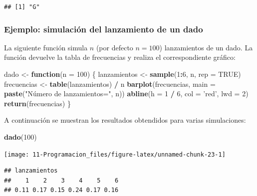 \documentclass[]{book}
\newenvironment{Shaded}{\begin{snugshade}}{\end{snugshade}}
\newcommand{\KeywordTok}[1]{\textcolor[rgb]{0.13,0.29,0.53}{\textbf{#1}}}
\newcommand{\DataTypeTok}[1]{\textcolor[rgb]{0.13,0.29,0.53}{#1}}
\newcommand{\DecValTok}[1]{\textcolor[rgb]{0.00,0.00,0.81}{#1}}
\newcommand{\StringTok}[1]{\textcolor[rgb]{0.31,0.60,0.02}{#1}}
\newcommand{\OtherTok}[1]{\textcolor[rgb]{0.56,0.35,0.01}{#1}}
\newcommand{\ControlFlowTok}[1]{\textcolor[rgb]{0.13,0.29,0.53}{\textbf{#1}}}
\newcommand{\OperatorTok}[1]{\textcolor[rgb]{0.81,0.36,0.00}{\textbf{#1}}}
\newcommand{\NormalTok}[1]{#1}
\begin{document}
\begin{verbatim}
## [1] "G"
\end{verbatim}

\subsubsection{Ejemplo: simulación del lanzamiento de un
dado}\label{ejemplo-simulacion-del-lanzamiento-de-un-dado}

La siguiente función simula \(n\) (por defecto \(n=100\)) lanzamientos
de un dado. La función devuelve la tabla de frecuencias y realiza el
correspondiente gráfico:

\begin{Shaded}
\begin{Highlighting}[]
\NormalTok{dado <-}\StringTok{ }\ControlFlowTok{function}\NormalTok{(}\DataTypeTok{n =} \DecValTok{100}\NormalTok{) \{}
\NormalTok{  lanzamientos <-}\StringTok{ }\KeywordTok{sample}\NormalTok{(}\DecValTok{1}\OperatorTok{:}\DecValTok{6}\NormalTok{, n, }\DataTypeTok{rep =} \OtherTok{TRUE}\NormalTok{)}
\NormalTok{  frecuencias <-}\StringTok{ }\KeywordTok{table}\NormalTok{(lanzamientos) }\OperatorTok{/}\StringTok{ }\NormalTok{n}
  \KeywordTok{barplot}\NormalTok{(frecuencias, }\DataTypeTok{main =} \KeywordTok{paste}\NormalTok{(}\StringTok{"Número de lanzamientos="}\NormalTok{, n))}
  \KeywordTok{abline}\NormalTok{(}\DataTypeTok{h =} \DecValTok{1} \OperatorTok{/}\StringTok{ }\DecValTok{6}\NormalTok{, }\DataTypeTok{col =} \StringTok{'red'}\NormalTok{, }\DataTypeTok{lwd =} \DecValTok{2}\NormalTok{)}
  \KeywordTok{return}\NormalTok{(frecuencias)}
\NormalTok{\}}
\end{Highlighting}
\end{Shaded}

A continuación se muestran los resultados obtendidos para varias
simulaciones:

\begin{Shaded}
\begin{Highlighting}[]
\KeywordTok{dado}\NormalTok{(}\DecValTok{100}\NormalTok{)}
\end{Highlighting}
\end{Shaded}

\begin{center}\texttt{[image: 11-Programacion\_files/figure-latex/unnamed-chunk-23-1]} \end{center}

\begin{verbatim}
## lanzamientos
##    1    2    3    4    5    6 
## 0.11 0.17 0.15 0.24 0.17 0.16
\end{verbatim}
\end{document}
